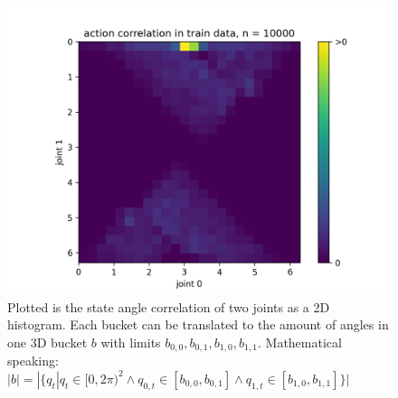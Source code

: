\begin{figure}
    \begin{center}
        \includegraphics[width=0.46 \linewidth]{figures/methodology/dataset/action_correlation.png}
    \end{center}
    \caption[action correlation CCD]{Plotted is the state angle correlation of two joints as a 2D histogram. Each bucket can be translated to the amount of angles in one 3D bucket $b$ with limits $b_{0, 0}, b_{0, 1}, b_{1, 0}, b_{1, 1}$. Mathematical speaking: $|b| = |\{q_t | q_t \in [0, 2\pi)^2 \land q_{0, t} \in [b_{0, 0}, b_{0, 1}] \land q_{1, t} \in [b_{1, 0}, b_{1, 1}]\}|$}
    \label{fig:dataset_action_correlation}
\end{figure}

